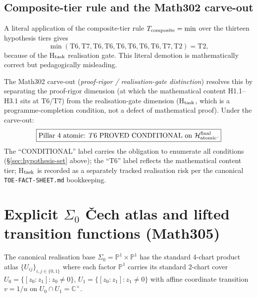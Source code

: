 \subsection{Composite-tier rule and the Math302 carve-out}

A literal application of the composite-tier rule
$T_{\rm composite} = \min$ over the thirteen hypothesis tiers gives
\[
\min(\mathrm{T6}, \mathrm{T7}, \mathrm{T6}, \mathrm{T6},
\mathrm{T6}, \mathrm{T6}, \mathrm{T6}, \mathrm{T6}, \mathrm{T7},
\mathrm{T2}) = \mathrm{T2},
\]
because of the H$_{\rm task}$ realisation gate. This literal demotion
is mathematically correct but pedagogically misleading.

The Math302 carve-out (\textit{proof-rigor / realisation-gate
distinction}) resolves this by separating the proof-rigor dimension
(at which the mathematical content H1.1--H3.1 sits at T6/T7) from
the realisation-gate dimension (H$_{\rm task}$, which is a
programme-completion condition, not a defect of mathematical proof).
Under the carve-out:
\begin{equation}
\boxed{\text{Pillar~4 atomic: } T6 \text{ PROVED CONDITIONAL on }
\mathcal{H}_{\rm atomic}^{\rm final}.}
\end{equation}
The ``CONDITIONAL'' label carries the obligation to enumerate all
conditions (\S\ref{sec:hypothesis-set} above); the ``T6'' label
reflects the mathematical content tier; H$_{\rm task}$ is recorded as
a separately tracked realisation risk per the canonical
\texttt{TOE-FACT-SHEET.md} bookkeeping.

\section{Explicit $\Sigma_0$ \v{C}ech atlas and lifted
transition functions (Math305)}\label{sec:sigma0}

The canonical realisation base
$\Sigma_0 = \mathbb{P}^1 \times \mathbb{P}^1$ has the standard
4-chart product atlas $\{U_{ij}\}_{i,j \in \{0,1\}}$ where each
factor $\mathbb{P}^1$ carries its standard 2-chart cover
$U_0 = \{[z_0 : z_1] : z_0 \neq 0\}$, $U_1 = \{[z_0 : z_1] : z_1 \neq
0\}$ with affine coordinate transition $v = 1/u$ on
$U_0 \cap U_1 = \mathbb{C}^\times$.

